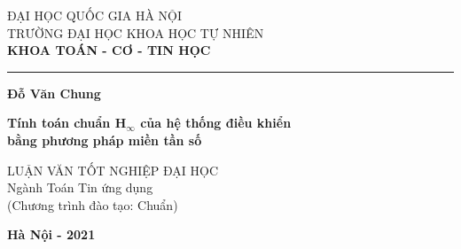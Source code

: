 \begin{titlepage}


\begin{center}
	{\fontsize{14pt}{15.6}\selectfont
		ĐẠI HỌC QUỐC GIA HÀ NỘI \\
		TRƯỜNG ĐẠI HỌC KHOA HỌC TỰ NHIÊN\\}
	\medspace
	{\fontsize{13pt}{15.6}\selectfont
		\textbf{KHOA TOÁN - CƠ - TIN HỌC}}
	
	\rule{7.25cm}{1pt}
	
	\vfill
	{\fontsize{14}{15.6}\selectfont \textbf{Đỗ Văn Chung}}
	\vfill
	
	{\fontsize{18}{20}\selectfont \textbf{Tính toán chuẩn H$_\infty$ của hệ thống điều khiển \\ bằng phương pháp miền tần số}}
	\vfill
	
	{\fontsize{14}{15.6}\selectfont 
		LUẬN VĂN TỐT NGHIỆP ĐẠI HỌC\\
		\vspace{1cm}
		Ngành Toán Tin ứng dụng\\
		(Chương trình đào tạo: Chuẩn)
	}
	
	\vfill
	{\fontsize{14}{15.6}\selectfont \textbf{Hà Nội - 2021}}
\end{center}
\end{titlepage}

